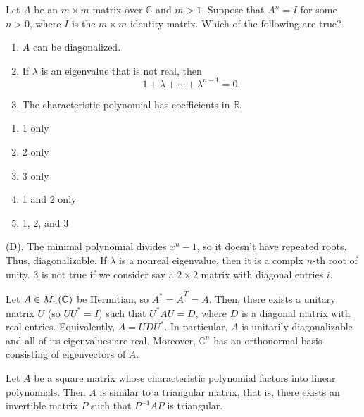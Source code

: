 \begin{exercise}
Let $A$ be an $m\times m$ matrix over $\mathbb{C}$ and $m>1$. Suppose that $A^n = I$ for some 
$n>0$, where $I$ is the $m\times m$ identity matrix. Which of the following are true?
\begin{enumerate}[label=(\Roman*)]
    \item $A$ can be diagonalized.

    \item If $\lambda$ is an eigenvalue that is not real, then
    \[
    1+\lambda+\cdots+\lambda^{n-1}=0.
    \]

    \item The characteristic polynomial has coefficients in $\mathbb{R}$.
\end{enumerate}

\begin{enumerate}[label=(\Alph*)]
    \item 1 only
    \item 2 only
    \item 3 only
    \item 1 and 2 only
    \item 1, 2, and 3
\end{enumerate}
\end{exercise}
\begin{solution}
(D). The minimal polynomial divides $x^n - 1$, so it doesn't have repeated roots. Thus, diagonalizable. 
If $\lambda$ is a nonreal eigenvalue, then it is a complx $n$-th root of unity. 
3 is not true if we consider say a $2\times2$ matrix with diagonal entries $i$.
\end{solution}

\begin{theorem}
Let $A\in M_n(\mathbb{C})$ be Hermitian, so $A^{\ast} = \overline{A}^T = A$.
Then, there exists a unitary matrix $U$ (so $UU^{\ast} = I$) such that $U^{\ast}AU = D$, where 
$D$ is a diagonal matrix with real entries. Equivalently, $A = UDU^{\ast}$.
In particular, $A$ is unitarily diagonalizable and all of its eigenvalues are real. Moreover, $\mathbb C^n$ has an orthonormal basis consisting of eigenvectors of $A$.
\end{theorem}


\begin{theorem}[Triangulizability]
Let $A$ be a square matrix whose characteristic polynomial
factors into linear polynomials. Then $A$ is similar to a triangular 
matrix, that is, there exists an invertible matrix $P$ such that 
$P^{-1}AP$ is triangular.
\end{theorem}

